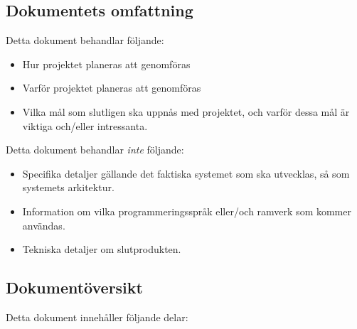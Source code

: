 \documentclass[11pt]{article}
\begin{document}
\subsection{Dokumentets omfattning}
\label{sec:org2d84802}
Detta dokument behandlar följande:

\begin{itemize}
\item Hur projektet planeras att genomföras

\item Varför projektet planeras att genomföras

\item Vilka mål som slutligen ska uppnås med projektet, och varför dessa
mål är viktiga och/eller intressanta.
\end{itemize}

Detta dokument behandlar \emph{inte} följande:

\begin{itemize}
\item Specifika detaljer gällande det faktiska systemet som ska utvecklas,
så som systemets arkitektur.

\item Information om vilka programmeringsspråk eller/och ramverk som kommer
användas.

\item Tekniska detaljer om slutprodukten.
\end{itemize}

\subsection{Dokumentöversikt}
\label{sec:org6c533a9}
Detta dokument innehåller följande delar:
\end{document}
